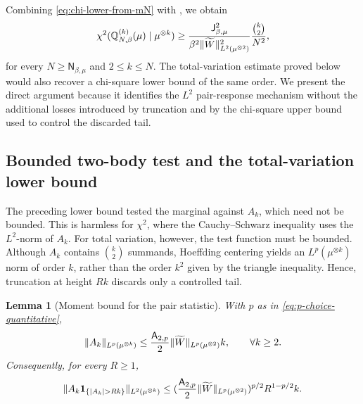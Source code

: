 \documentclass[11pt,reqno]{amsart}
\numberwithin{equation}{section}
\theoremstyle{plain}
\newtheorem{lemma}[lemma]{Lemma}
\theoremstyle{remark}
\DeclarePairedDelimiter{\pa}{\lparen}{\rparen}
\DeclarePairedDelimiter{\norm}{\lVert}{\rVert}
\newcommand{\Q}{{\mathbb{Q}}}
\newcommand{\tl}{\widetilde}
\newcommand{\be}{\beta}
\newcommand{\Chi}{\chi^2}
\newcommand{\one}{\mathbf 1}
\begin{document}
Combining \eqref{eq:chi-lower-from-mN} with
, we obtain
\begin{align}\label{eq:direct-chi-lower-quantitative}
 \Chi\pa{\Q_{N,\be}^{(k)}(\mu)\mid\mu^{\otimes k}}
 \ge
 \frac{\mathsf J_{\be,\mu}^2}
 {\be^2\norm{\tl W}_{L^2(\mu^{\otimes2})}^2}
 \frac{\binom{k}{2}}{N^2},
\end{align}
for every \(N\ge\mathsf N_{\be,\mu}\) and \(2\le k\le N\).
The total-variation estimate proved below would also recover a chi-square
lower bound of the same order.  We present the direct argument because it
identifies the \(L^2\) pair-response mechanism without the additional losses
introduced by truncation and by the chi-square upper bound used to control
the discarded tail.


\subsection{Bounded two-body test and the total-variation lower bound}
\label{sec:bounded-two-body-test-tv-lower-bound}

The preceding lower bound tested the marginal against \(A_k\), which need not be
bounded.  This is harmless for \(\chi^2\), where the Cauchy--Schwarz inequality uses
the \(L^2\)-norm of \(A_k\).  For total variation, however, the test function
must be bounded.  Although \(A_k\) contains \(\binom{k}{2}\) summands, Hoeffding
centering yields an \(L^p(\mu^{\otimes k})\) norm of order \(k\), rather than
the order \(k^2\) given by the triangle inequality.  Hence, truncation at
height \(Rk\) discards only a controlled tail.

\begin{lemma}[Moment bound for the pair statistic]\label{lem:Ak-Lp-bound}
With \(p\) as in \eqref{eq:p-choice-quantitative},
\begin{align}\label{eq:Ak-Lp-bound}
 \norm{A_k}_{L^p(\mu^{\otimes k})}
 \le \frac{\mathsf A_{2,p}}2\norm{\tl W}_{L^p(\mu^{\otimes2})} k,
 \qquad \forall k\ge2.
\end{align}
Consequently, for every \(R\ge1\),
\begin{align}\label{eq:Ak-tail-L2}
 \norm{A_k\one_{\{|A_k|>Rk\}}}_{L^2(\mu^{\otimes k})}
 \le \pa{\frac{\mathsf A_{2,p}}2\norm{\tl W}_{L^p(\mu^{\otimes2})}}^{p/2}
 R^{1-p/2}k.
\end{align}
\end{lemma}
\end{document}
